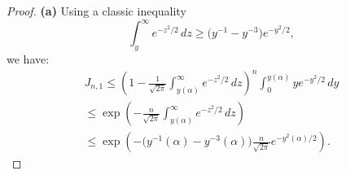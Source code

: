 \documentclass[11pt]{amsart}
\def\eps{\varepsilon}
\def\a{\alpha}
\theoremstyle{remark}
\numberwithin{equation}{section}
\begin{document}
\begin{proof}
{\bf (a)\/} Using a classic inequality
 \begin{equation}\label{verynew1}
\int_y^{\infty}e^{-z^2/2}\,dz\ge \bigl(y^{-1}-y^{-3}\big)e^{-y^2/2},
\end{equation}
we have: 
\begin{multline}\label{new4}
J_{n,1}\le\left(1-\frac{1}{\sqrt{2\pi}}\int_{y(\a)}^{\infty}e^{-z^2/2}\,dz\right)^n\int_0^{y(\a)}ye^{-y^2/2}\,dy\\
\le \exp\left(-\frac{n}{\sqrt{2\pi}}\int_{y(\a)}^{\infty}e^{-z^2/2}\,dz\right)\\
\le\exp\left(-\bigl(y^{-1}(\a)-y^{-3}(\a)\bigr)\frac{n}{\sqrt{2\pi}}e^{-y^2(\a)/2}\right).
\end{multline}


\end{proof}
\end{document}
